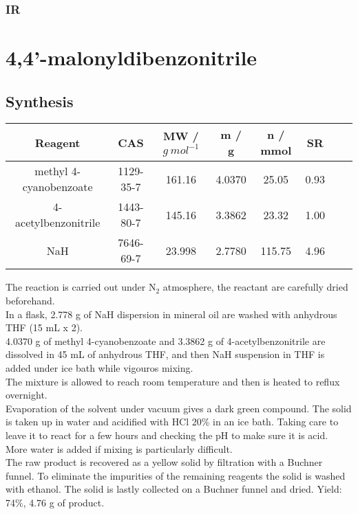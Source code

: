 \documentclass[../Master.tex]{subfiles}
\begin{document}

\subsubsection{IR}


\newpage \section{4,4'-malonyldibenzonitrile}
\subsection{Synthesis}
\begin{center}
	\begin{tabular}[b]{cccccccc}
		\toprule
		Reagent                & CAS       & MW / \(g \ mol^{-1}\) & m / g  & n / mmol & SR   \\
		\midrule
		methyl 4-cyanobenzoate & 1129-35-7 & 161.16                & 4.0370 & 25.05    & 0.93 \\
		4-acetylbenzonitrile   & 1443-80-7 & 145.16                & 3.3862 & 23.32    & 1.00 \\
		NaH                    & 7646-69-7 & 23.998                & 2.7780 & 115.75   & 4.96 \\
		\bottomrule
	\end{tabular}
\end{center}
The reaction is carried out under N$_{2}$ atmosphere, the reactant are carefully dried beforehand.\\
In a flask, 2.778 g of NaH dispersion in mineral oil are washed with anhydrous THF (15 mL x 2).\\
4.0370 g of methyl 4-cyanobenzoate and 3.3862 g of 4-acetylbenzonitrile are dissolved in 45 mL of anhydrous THF, and then NaH suspension in THF is added under ice bath while vigouros mixing. \\
The mixture is allowed to reach room temperature and then is heated to reflux overnight. \\
Evaporation of the solvent under vacuum gives a dark green compound. The solid is taken up in water and acidified with HCl 20\% in an ice bath. Taking care to leave it to react for a few hours and checking the pH to make sure it is acid. More water is added if mixing is particularly difficult.\\
The raw product is recovered as a yellow solid by filtration with a Buchner funnel.
To eliminate the impurities of the remaining reagents the solid is washed with ethanol. The solid is lastly collected on a Buchner funnel and dried. Yield: 74\%, 4.76 g of product.
\pagebreak
\end{document}
